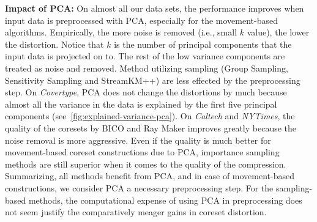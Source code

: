 {\bf Impact of PCA:}
On almost all our data sets, the performance improves when input data is preprocessed with PCA, especially for the movement-based algorithms. Empirically, the more noise is removed (i.e., small $k$ value), the lower the distortion. Notice that $k$ is the number of principal components that the input data is projected on to. The rest of the low variance components are treated as noise and removed. Method utilizing sampling (Group Sampling, Sensitivity Sampling and StreamKM++) are less effected by the preprocessing step. On \textit{Covertype}, PCA does not change the distortions by much because almost all the variance in the data is explained by the first five principal components (see~\cref{fig:explained-variance-pca}). 
On \textit{Caltech} and \textit{NYTimes}, the quality of the coresets by BICO and Ray Maker improves greatly because the noise removal is more aggressive. Even if the quality is much better for movement-based coreset constructions due to PCA, importance sampling methods are still superior when it comes to the quality of the compression. Summarizing, all methods benefit from PCA, and in case of movement-based constructions, we consider PCA a necessary preprocessing step. For the sampling-based methods, the computational expense of using PCA in preprocessing does not seem justify the comparatively meager gains in coreset distortion.



